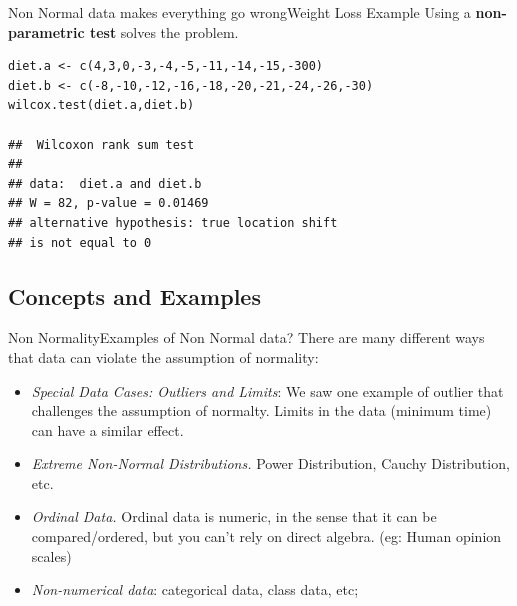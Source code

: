 \begin{frame}[fragile]{Non Normal data makes everything go wrong}{Weight Loss Example}
Using a {\bf non-parametric test} solves the problem.

{\small
\begin{verbatim}
diet.a <- c(4,3,0,-3,-4,-5,-11,-14,-15,-300)
diet.b <- c(-8,-10,-12,-16,-18,-20,-21,-24,-26,-30)
wilcox.test(diet.a,diet.b)

##  Wilcoxon rank sum test
##
## data:  diet.a and diet.b
## W = 82, p-value = 0.01469
## alternative hypothesis: true location shift
## is not equal to 0
\end{verbatim}}
\end{frame}

\subsection{Concepts and Examples}

\begin{frame}{Non Normality}{Examples of Non Normal data?}
  There are many different ways that data can violate the assumption of normality:

  \begin{itemize}
    \item \emph{Special Data Cases: Outliers and Limits}: We saw one example of outlier that challenges the assumption of normalty. Limits in the data (minimum time) can have a similar effect.\bigskip

    \item \emph{Extreme Non-Normal Distributions.} Power Distribution, Cauchy Distribution, etc.\bigskip

    \item \emph{Ordinal Data.} Ordinal data is numeric, in the sense
    that it can be compared/ordered, but you can't rely on direct algebra.
    (eg: Human opinion scales)\bigskip

    \item \emph{Non-numerical data}: categorical data, class data, etc;
  \end{itemize}
\end{frame}


